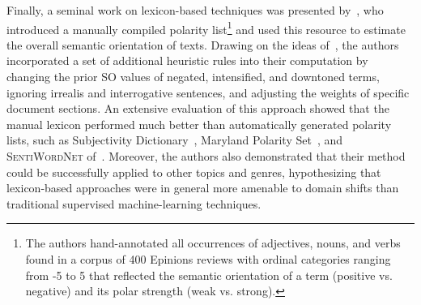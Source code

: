 Finally, a seminal work on lexicon-based techniques was presented
by~\citet{Taboada:11}, who introduced a manually compiled polarity
list\footnote{The authors hand-annotated all occurrences of
  adjectives, nouns, and verbs found in a corpus of 400 Epinions
  reviews with ordinal categories ranging from -5 to 5 that reflected
  the semantic orientation of a term (positive vs. negative) and its
  polar strength (weak vs. strong).} and used this resource to
estimate the overall semantic orientation of texts.  Drawing on the
ideas of~\citet{Polanyi:06}, the authors incorporated a set of
additional heuristic rules into their computation by changing the
prior SO values of negated, intensified, and downtoned terms, ignoring
irrealis and interrogative sentences, and adjusting the weights of
specific document sections.  An extensive evaluation of this approach
showed that the manual lexicon performed much better than
automatically generated polarity lists, such as Subjectivity
Dictionary~\cite{Wilson:05}, Maryland Polarity Set~\cite{Mohammad:09},
and \textsc{SentiWordNet} of~\citet{Esuli:06c}.  Moreover, the authors
also demonstrated that their method could be successfully applied to
other topics and genres, hypothesizing that lexicon-based approaches
were in general more amenable to domain shifts than traditional
supervised machine-learning techniques.


